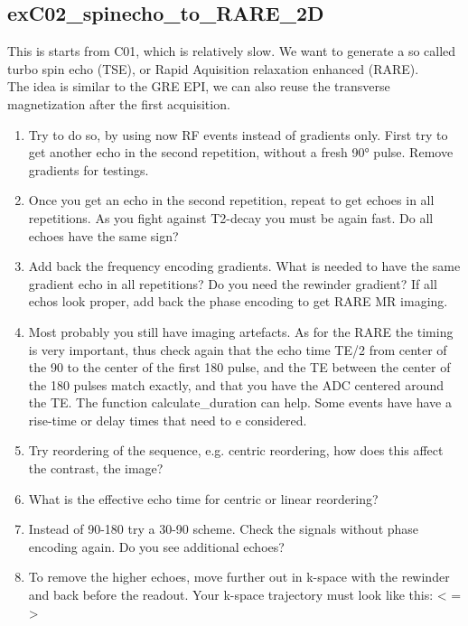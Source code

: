 \documentclass[a4paper,12pt]{extarticle}
\begin{document}
\subsection{exC02\_spinecho\_to\_RARE\_2D}
This is starts from C01, which is relatively slow. We want to generate a so called turbo spin echo (TSE), or Rapid Aquisition relaxation enhanced (RARE). \\
The idea is similar to the GRE EPI, we can also reuse the transverse magnetization after the first acquisition.
\begin{enumerate}
\item  Try to do so, by using now RF events instead of gradients only. First try to get another echo in the second repetition, without a fresh 90° pulse. Remove gradients for testings. 

\item Once you get an echo in the second repetition, repeat to get echoes in all repetitions. As you fight against T2-decay you must be again fast. Do all echoes have the same sign?

\item Add back the frequency encoding gradients. What is needed to have the same gradient echo in all repetitions? Do you need the rewinder gradient? If all echos look proper, add back the phase encoding to get RARE MR imaging.

\item Most probably you still have imaging artefacts. As for the RARE the timing is very important, thus check again that the echo time TE/2 from center of the 90 to the center of the first 180 pulse, and the TE between the center of the 180 pulses match exactly, and that you have the ADC centered around the TE. The function calculate\_duration can help. Some events have have a rise-time or delay times that need to e considered.

\item Try reordering of the sequence, e.g. centric reordering, how does this affect the contrast, the image? 

\item What is the effective echo time for centric or linear reordering?

\item Instead of 90-180 try a 30-90 scheme. Check the signals without phase encoding again. Do you see additional echoes? \\

\item To remove the higher echoes, move further out in k-space with the rewinder and back before the readout. Your k-space trajectory must look like this: < = >



\end{enumerate}
\end{document}

